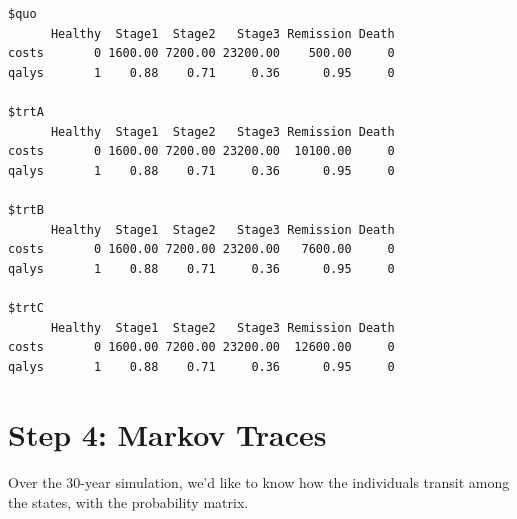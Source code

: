 \documentclass[
  letterpaper,
  DIV=11,
  numbers=noendperiod,
  oneside]{scrartcl}
\begin{document}
\begin{verbatim}
$quo
      Healthy  Stage1  Stage2   Stage3 Remission Death
costs       0 1600.00 7200.00 23200.00    500.00     0
qalys       1    0.88    0.71     0.36      0.95     0

$trtA
      Healthy  Stage1  Stage2   Stage3 Remission Death
costs       0 1600.00 7200.00 23200.00  10100.00     0
qalys       1    0.88    0.71     0.36      0.95     0

$trtB
      Healthy  Stage1  Stage2   Stage3 Remission Death
costs       0 1600.00 7200.00 23200.00   7600.00     0
qalys       1    0.88    0.71     0.36      0.95     0

$trtC
      Healthy  Stage1  Stage2   Stage3 Remission Death
costs       0 1600.00 7200.00 23200.00  12600.00     0
qalys       1    0.88    0.71     0.36      0.95     0
\end{verbatim}

\hypertarget{step-4-markov-traces}{%
\section{Step 4: Markov Traces}\label{step-4-markov-traces}}

Over the 30-year simulation, we'd like to know how the individuals
transit among the states, with the probability matrix.
\end{document}
